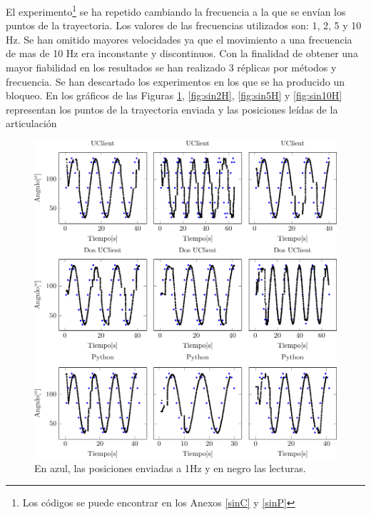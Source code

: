 \documentclass[12pt,a4paper,final,twoside]{book}
\begin{document}
El experimento\footnote{Los códigos se puede encontrar en los Anexos \ref{sinC} y \ref{sinP}} se ha repetido cambiando la frecuencia a la que se envían los puntos de la trayectoria. Los valores de las frecuencias utilizados son: 1, 2, 5 y 10 Hz. Se han omitido mayores velocidades ya que el movimiento a una frecuencia de mas de 10 Hz era inconstante y discontinuos. Con la finalidad de obtener una mayor fiabilidad en los resultados se han realizado 3 réplicas por métodos y frecuencia.
Se han descartado los experimentos en los que se ha producido un bloqueo.
En los gráficos de las Figuras \ref{fig:sin1H}, \ref{fig:sin2H}, \ref{fig:sin5H} y \ref{fig:sin10H} representan los puntos de la trayectoria enviada y las posiciones leídas de la articulación
\begin{figure}[H]
	\centering
    \includegraphics[scale=1]{plots/h1-f1.pdf}
 
   	 \caption{En azul, las posiciones enviadas a 1Hz y en negro las lecturas.}
  \label{fig:sin1H}
\end{figure}
\end{document}
